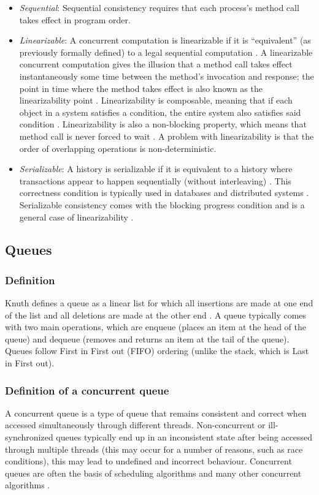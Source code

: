 \begin{itemize}
\item \emph{Sequential}: Sequential consistency requires that each process's method call takes effect in program order.
\item \emph{Linearizable}: A concurrent computation is linearizable if it is ``equivalent'' (as previously formally defined) to a legal sequential computation \cite{herlihy1990linearizability}. A linearizable concurrent computation gives the illusion that a method call takes effect instantaneously some time between the method's invocation and response; the point in time where the method takes effect is also known as the linearizability point \cite{herlihy2020art,herlihy1990linearizability}. Linearizability is composable, meaning that if each object in a system satisfies a condition, the entire system also satisfies said condition \cite[Chapter~3.3.1]{herlihy2020art}. Linearizability is also a non-blocking property, which means that method call is never forced to wait \cite{herlihy1990linearizability}. A problem with linearizability is that the order of overlapping operations is non-deterministic.
\item \emph{Serializable}: A history is serializable if it is equivalent to a history where transactions appear to happen sequentially (without interleaving) \cite[Section~3.3]{herlihy1990linearizability}. This correctness condition is typically used in databases and distributed systems \cite{guerraoui2019consensus}. Serializable consistency comes with the blocking progress condition and is a general case of linearizability \cite{herlihy1990linearizability}.
\end{itemize}
\subsection{Queues}
\subsubsection{Definition}
Knuth defines a queue as a linear list for which all insertions are made at one end of the list and all deletions are made at the other end \cite{knuth1968art}. A queue typically comes with two main operations, which are enqueue (places an item at the head of the queue) and dequeue (removes and returns an item at the tail of the queue). Queues follow First in First out (FIFO) ordering (unlike the stack, which is Last in First out).
\subsubsection{Definition of a concurrent queue}
A concurrent queue is a type of queue that remains consistent and correct when accessed simultaneously through different threads. Non-concurrent or ill-synchronized queues typically end up in an inconsistent state after being accessed through multiple threads (this may occur for a number of reasons, such as race conditions)\cite{yahav2003automatically}, this may lead to undefined and incorrect behaviour. Concurrent queues are often the basis of scheduling algorithms and many other concurrent algorithms \cite{yahav2003automatically}.
